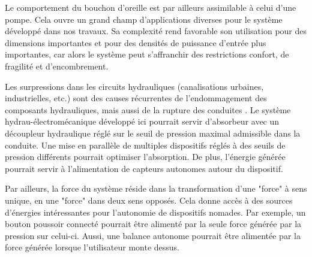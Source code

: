 Le comportement du bouchon d'oreille est par ailleurs assimilable à celui d'une pompe. Cela ouvre un grand champ d'applications diverses pour le système développé dans nos travaux. Sa complexité rend favorable son utilisation pour des dimensions importantes et pour des densités de puissance d'entrée plus importantes, car alors le système peut s'affranchir des restrictions confort, de fragilité et d'encombrement.

Les surpressions dans les circuits hydrauliques (canalisations urbaines, industrielles, etc.) sont des causes récurrentes de l'endommagement des composants hydrauliques, mais aussi de la rupture des conduites \cite{Koutnik2006,Flemming2009}. Le système hydrau-électromécanique développé ici pourrait servir d'absorbeur avec un découpleur hydraulique réglé sur le seuil de pression maximal admissible dans la conduite. Une mise en parallèle de multiples dispositifs réglés à des seuils de pression différents pourrait optimiser l'absorption. De plus, l'énergie générée pourrait servir à l'alimentation de capteurs autonomes autour du dispositif.

Par ailleurs, la force du système réside dans la transformation d'une "force" à sens unique, en une "force" dans deux sens opposés. Cela donne accès à des sources d'énergies intéressantes pour l'autonomie de dispositifs nomades. Par exemple, un bouton poussoir connecté pourrait être alimenté par la seule force générée par la pression sur celui-ci. Aussi, une balance autonome pourrait être alimentée par la force générée lorsque l'utilisateur monte dessus.




